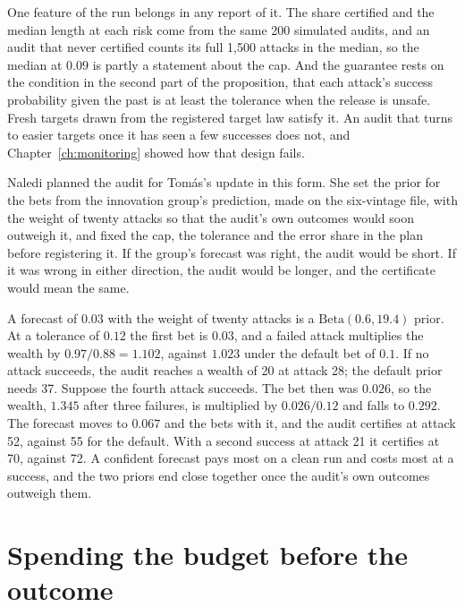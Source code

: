 One feature of the run belongs in any report of it. The share certified and the median length at
each risk come from the same 200 simulated audits, and an audit that never certified counts its full
1,500 attacks in the median, so the median at $0.09$ is partly a statement about the cap. And the
guarantee rests on the condition in the second part of the proposition, that each attack's success
probability given the past is at least the tolerance when the release is unsafe. Fresh targets
drawn from the registered target law satisfy it. An audit that turns to easier targets once it has
seen a few successes does not, and Chapter~\ref{ch:monitoring} showed how that design fails.

Naledi planned the audit for Tom\'as's update in this form. She set the prior for the bets from the
innovation group's prediction, made on the six-vintage file, with the weight of twenty attacks so
that the audit's own outcomes would soon outweigh it, and fixed the cap, the tolerance and the
error share in the plan before registering it. If the group's forecast was right, the audit would
be short. If it was wrong in either direction, the audit would be longer, and the certificate
would mean the same.

\begin{example}\label{c22:ex-bets}
A forecast of $0.03$ with the weight of twenty attacks is a $\mathrm{Beta}(0.6,19.4)$ prior. At a tolerance of $0.12$ the first bet is
$0.03$, and a failed attack multiplies the wealth by $0.97/0.88=1.102$, against $1.023$ under the default
bet of $0.1$. If no attack succeeds, the audit reaches a wealth of 20 at attack 28; the default prior
needs 37. Suppose the fourth attack succeeds. The bet then was $0.026$, so the wealth, $1.345$ after three
failures, is multiplied by $0.026/0.12$ and falls to $0.292$. The forecast moves to $0.067$ and the bets
with it, and the audit certifies at attack 52, against 55 for the default. With a second success at
attack 21 it certifies at 70, against 72. A confident forecast pays most on a clean run and costs
most at a success, and the two priors end close together once the audit's own outcomes outweigh them.
\end{example}

\section{Spending the budget before the outcome}\label{c22:sec-registry}

